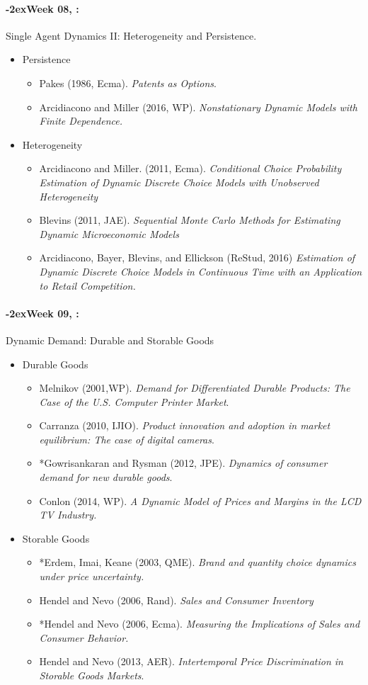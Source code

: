 \documentclass[11pt]{article}
\newcommand{\week}[1]{%
  \paragraph*{\kern-2ex\quad #1, \syldate{\today}:}%
  \ifdim\wd1=\wd\THURSDAY
    \AdvanceDate[7]
  \else
    \AdvanceDate[7]
  \fi%
}
\begin{document}
\week{Week 08} Single Agent Dynamics II: Heterogeneity and Persistence. 
\begin{itemize}
\item Persistence
\begin{itemize}
\item Pakes (1986, Ecma). \textit{Patents as Options}.
\item Arcidiacono and Miller (2016, WP). \textit{Nonstationary Dynamic Models with Finite Dependence.}
\end{itemize}
\item Heterogeneity
\begin{itemize}
\item Arcidiacono and Miller. (2011, Ecma). \textit{Conditional Choice Probability Estimation of Dynamic Discrete Choice Models with Unobserved Heterogeneity}
\item Blevins (2011, JAE). \textit{Sequential Monte Carlo Methods for Estimating Dynamic Microeconomic Models}
\item Arcidiacono, Bayer, Blevins, and Ellickson (ReStud, 2016) \textit{Estimation of Dynamic Discrete Choice Models in Continuous Time with an Application to Retail Competition.}
\end{itemize}
\end{itemize}

\week{Week 09} Dynamic Demand: Durable and Storable Goods
\begin{itemize}
\item Durable Goods
\begin{itemize}
\item Melnikov (2001,WP). \textit{Demand for Differentiated Durable Products: The Case of the U.S. Computer Printer Market}.
\item Carranza (2010, IJIO). \textit{Product innovation and adoption in market equilibrium: The case of digital cameras}.
\item *Gowrisankaran and Rysman (2012, JPE). \textit{Dynamics of consumer demand for new durable goods}.
\item Conlon (2014, WP). \textit{A Dynamic Model of Prices and Margins in the LCD TV Industry.}
\end{itemize}
\item Storable Goods
\begin{itemize}
\item *Erdem, Imai, Keane (2003, QME). \textit{Brand and quantity choice dynamics under price uncertainty.}
\item Hendel and Nevo (2006, Rand). \textit{Sales and Consumer Inventory}
\item *Hendel and Nevo (2006, Ecma). \textit{Measuring the Implications of Sales and Consumer Behavior.}
\item Hendel and Nevo (2013, AER). \textit{Intertemporal Price Discrimination in Storable Goods Markets}.
\end{itemize}
\end{itemize}
\end{document}
